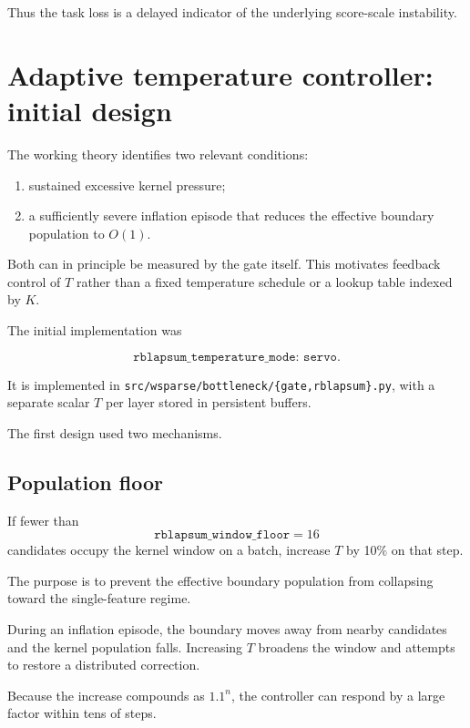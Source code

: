 \documentclass[11pt,a4paper]{article}
\newcommand{\code}[1]{\texttt{#1}}
\begin{document}
Thus the task loss is a delayed indicator of the underlying score-scale
instability.


\section{Adaptive temperature controller: initial design}

The working theory identifies two relevant conditions:

\begin{enumerate}[leftmargin=1.6em]
    \item sustained excessive kernel pressure;
    \item a sufficiently severe inflation episode that reduces the effective
    boundary population to \(O(1)\).
\end{enumerate}

Both can in principle be measured by the gate itself.
This motivates feedback control of \(T\) rather than a fixed temperature
schedule or a lookup table indexed by \(K\).

The initial implementation was

\[
\code{rblapsum\_temperature\_mode: servo}.
\]

It is implemented in
\code{src/wsparse/bottleneck/\{gate,rblapsum\}.py},
with a separate scalar \(T\) per layer stored in persistent buffers.

The first design used two mechanisms.

\subsection*{Population floor}

If fewer than
\[
\code{rblapsum\_window\_floor}=16
\]
candidates occupy the kernel window on a batch, increase \(T\) by 10\% on that
step.

The purpose is to prevent the effective boundary population from collapsing
toward the single-feature regime.

During an inflation episode, the boundary moves away from nearby candidates
and the kernel population falls. Increasing \(T\) broadens the window and
attempts to restore a distributed correction.

Because the increase compounds as \(1.1^n\), the controller can respond by a
large factor within tens of steps.
\end{document}
